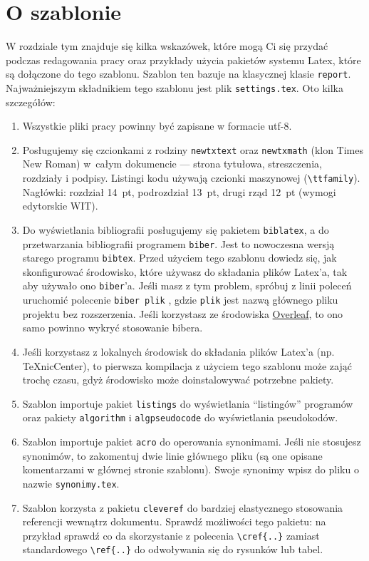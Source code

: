 \chapter{O szablonie}
\label{chapt:Przyklady}

W rozdziale tym znajduje się kilka wskazówek, które mogą Ci się przydać podczas redagowania pracy 
oraz przykłady użycia pakietów systemu Latex, które są dołączone do tego szablonu. 
Szablon ten bazuje na klasycznej klasie \texttt{report}. Najważniejszym składnikiem tego szablonu jest plik \texttt{settings.tex}. 
Oto kilka szczegółów:
\begin{enumerate}

\item Wszystkie pliki pracy powinny być zapisane w formacie utf-8.

\item Posługujemy się czcionkami z rodziny \texttt{newtxtext} oraz \texttt{newtxmath} (klon Times New Roman) w~całym dokumencie — strona tytułowa, streszczenia, rozdziały i podpisy. Listingi kodu używają czcionki maszynowej (\texttt{\textbackslash ttfamily}). Nagłówki: rozdział 14~pt, podrozdział 13~pt, drugi rząd 12~pt (wymogi edytorskie WIT). 

\item Do wyświetlania bibliografii posługujemy się pakietem \texttt{biblatex},
a do przetwarzania bibliografii programem \texttt{biber}. Jest to   nowoczesna wersją starego programu \texttt{bibtex}. Przed użyciem tego szablonu dowiedz się, jak skonfigurować środowisko, które używasz do składania plików Latex'a, tak aby używało ono \texttt{biber}'a. Jeśli masz z tym problem, spróbuj z linii poleceń uruchomić polecenie \texttt{biber plik} , gdzie \texttt{plik} jest nazwą głównego  pliku projektu bez rozszerzenia. 
Jeśli korzystasz ze środowiska \href{https://www.overleaf.com/}{Overleaf}, to ono samo powinno wykryć stosowanie bibera.

\item Jeśli korzystasz z lokalnych środowisk do składania plików Latex'a (np. TeXnicCenter), to pierwsza kompilacja z użyciem tego szablonu może zająć trochę czasu, gdyż środowisko może doinstalowywać potrzebne pakiety.
  
\item Szablon importuje pakiet \texttt{listings} do wyświetlania ``listingów'' programów oraz  pakiety \texttt{algorithm} i \texttt{algpseudocode} do wyświetlania pseudokodów. 

\item Szablon importuje pakiet \texttt{acro} do operowania synonimami. Jeśli nie stosujesz synonimów, to zakomentuj dwie linie głównego pliku (są one opisane komentarzami w głównej stronie szablonu). Swoje synonimy wpisz do pliku o nazwie \texttt{synonimy.tex}. 

\item Szablon korzysta z pakietu \texttt{cleveref} do bardziej elastycznego stosowania referencji wewnątrz dokumentu. Sprawdź możliwości tego pakietu: na przykład sprawdź co da skorzystanie z polecenia \verb|\cref{..}| 
zamiast standardowego \verb|\ref{..}| do odwoływania się do rysunków lub tabel.  
\end{enumerate}


